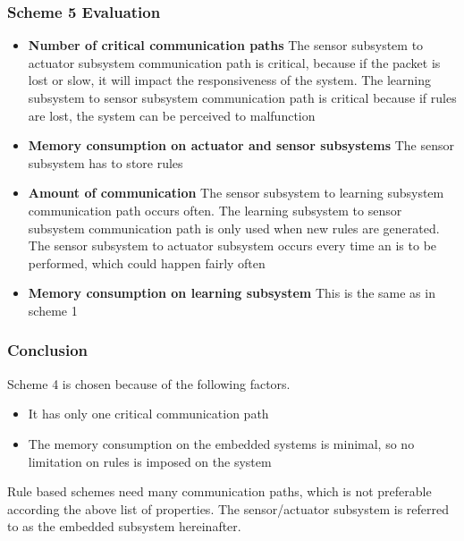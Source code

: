 \subsubsection{Scheme 5 Evaluation}
\begin{itemize}
\item \textbf{Number of critical communication paths} The sensor subsystem to actuator subsystem communication path is critical, because if the packet is lost or slow, it will impact the responsiveness of the system. The learning subsystem to sensor subsystem communication path is critical because if rules are lost, the system can be perceived to malfunction
\item \textbf{Memory consumption on actuator and sensor subsystems} The sensor subsystem has to store rules
\item \textbf{Amount of communication} The sensor subsystem to learning subsystem communication path occurs often. The learning subsystem to sensor subsystem communication path is only used when new rules are generated. The sensor subsystem to actuator subsystem occurs every time an is to be performed, which could happen fairly often
\item \textbf{Memory consumption on learning subsystem} This is the same as in scheme 1
\end{itemize}

\subsubsection{Conclusion}
Scheme 4 is chosen because of the following factors.
\begin{itemize}
\item It has only one critical communication path
\item The memory consumption on the embedded systems is minimal, so no limitation on rules is imposed on the system
\end{itemize}

Rule based schemes need many communication paths, which is not preferable according the above list of properties. The sensor/actuator subsystem is referred to as the embedded subsystem hereinafter.
